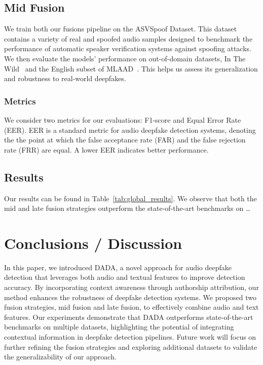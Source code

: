 \documentclass{Interspeech}
\begin{document}


\subsection{Mid Fusion}

We train both our fusions pipeline on the ASVSpoof Dataset. This dataset
contains a variety of real and spoofed audio samples designed to benchmark the
performance of automatic speaker verification systems against spoofing attacks.
We then evaluate the models' performance on out-of-domain datasets, In The
Wild~\cite{in_the_wild} and the English subset of MLAAD~\cite{mlaad}. This
helps us assess its generalization and robustness to real-world deepfakes.

\subsubsection{Metrics}
We consider two metrics for our evaluations: F1-score and Equal Error Rate
(EER).
EER is a standard metric for audio deepfake detection systems, denoting the the
point at which the false acceptance rate (FAR) and the false rejection rate
(FRR) are equal. A lower EER indicates better performance.

\subsection{Results}

Our results can be found in Table~\ref{tab:global_results}. We observe that
both the mid and late fusion strategies outperform the state-of-the-art
benchmarks on \dots

\section{Conclusions / Discussion}\label{sec:conclusions}

In this paper, we introduced DADA, a novel approach for audio deepfake
detection that leverages both audio and textual features to improve detection
accuracy. By incorporating context awareness through authorship attribution,
our method enhances the robustness of deepfake detection systems. We proposed
two fusion strategies, mid fusion and late fusion, to effectively combine audio
and text features. Our experiments demonstrate that DADA outperforms
state-of-the-art benchmarks on multiple datasets, highlighting the potential of
integrating contextual information in deepfake detection pipelines. Future work
will focus on further refining the fusion strategies and exploring additional
datasets to validate the generalizability of our approach.
\end{document}
